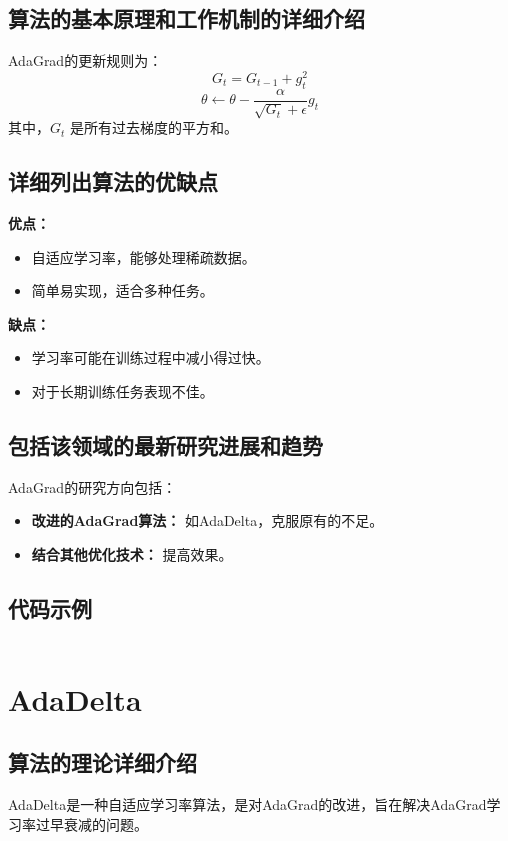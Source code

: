 \subsection*{算法的基本原理和工作机制的详细介绍}
AdaGrad的更新规则为：
\[
    G_t = G_{t-1} + g_t^2
\]
\[
    \theta \leftarrow \theta - \frac{\alpha}{\sqrt{G_t} + \epsilon} g_t
\]
其中，\(G_t\) 是所有过去梯度的平方和。

\subsection*{详细列出算法的优缺点}
\textbf{优点：}
\begin{itemize}
    \item 自适应学习率，能够处理稀疏数据。
    \item 简单易实现，适合多种任务。
\end{itemize}

\textbf{缺点：}
\begin{itemize}
    \item 学习率可能在训练过程中减小得过快。
    \item 对于长期训练任务表现不佳。
\end{itemize}

\subsection*{包括该领域的最新研究进展和趋势}
AdaGrad的研究方向包括：
\begin{itemize}
    \item \textbf{改进的AdaGrad算法：} 如AdaDelta，克服原有的不足。
    \item \textbf{结合其他优化技术：} 提高效果。
\end{itemize}
\subsection*{代码示例}
\begin{lstlisting}

\end{lstlisting}


\section{AdaDelta}
\subsection*{算法的理论详细介绍}
AdaDelta是一种自适应学习率算法，是对AdaGrad的改进，旨在解决AdaGrad学习率过早衰减的问题。

